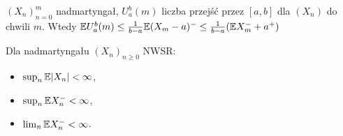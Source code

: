 	\begin{lemma}
		$(X_n)_{n=0}^m$ nadmartyngał, $U_a^b(m)$ liczba przejść 
		przez $[a,b]$ dla $(X_n)$ do chwili $m$.
		Wtedy 
		$\mathbb{E} U_a^b(m) 
		\leq 
		\frac{1}{b-a} \mathbb{E} (X_m - a)^-
		\leq
		\frac{1}{b-a} (\mathbb{E} X_m^- + a^+)$
	\end{lemma}
	
	\begin{fact}
		Dla nadmartyngału $(X_n)_{n \geq 0}$ NWSR:
		\begin{itemize}
			\item $\sup_n \mathbb{E} |X_n| < \infty$,
			\item $\sup_n \mathbb{E} X_n^- < \infty$,
			\item $\lim_n \mathbb{E} X_n^- < \infty$.
		\end{itemize}

	\end{fact}










 
 
